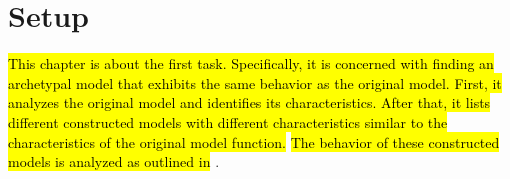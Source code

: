 \chapter{Setup}
\label{chap:setup}

\hl{
	This chapter is about the first task.
	Specifically, it is concerned with finding an archetypal model that exhibits the same behavior as the original model.
	First, it analyzes the original model and identifies its characteristics.
	After that, it lists different constructed models with different characteristics similar to the characteristics of the original model function.
}
\hl{The behavior of these constructed models is analyzed as outlined in} .






